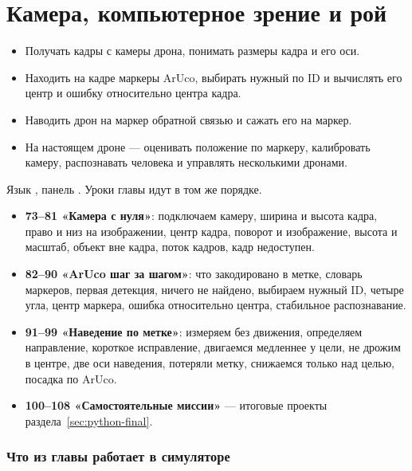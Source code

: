 \section{Камера, компьютерное зрение и рой}
\label{sec:python-vision}

\begin{infobox}
\begin{itemize}
    \item Получать кадры с камеры дрона, понимать размеры кадра и его оси.
    \item Находить на кадре маркеры ArUco, выбирать нужный по ID и вычислять его центр и ошибку относительно центра кадра.
    \item Наводить дрон на маркер обратной связью и сажать его на маркер.
    \item На настоящем дроне --- оценивать положение по маркеру, калибровать камеру, распознавать человека и управлять несколькими дронами.
\end{itemize}
\end{infobox}

\begin{missionbox}
Язык , панель . Уроки главы идут в том же порядке.
\begin{itemize}
    \item \textbf{73--81 «Камера с нуля»}: подключаем камеру, ширина и высота кадра, право и низ на изображении, центр кадра, поворот и изображение, высота и масштаб, объект вне кадра, поток кадров, кадр недоступен.
    \item \textbf{82--90 «ArUco шаг за шагом»}: что закодировано в метке, словарь маркеров, первая детекция, ничего не найдено, выбираем нужный ID, четыре угла, центр маркера, ошибка относительно центра, стабильное распознавание.
    \item \textbf{91--99 «Наведение по метке»}: измеряем без движения, определяем направление, короткое исправление, двигаемся медленнее у цели, не дрожим в центре, две оси наведения, потеряли метку, снижаемся только над целью, посадка по ArUco.
    \item \textbf{100--108 «Самостоятельные миссии»} --- итоговые проекты раздела~\ref{sec:python-final}.
\end{itemize}
\end{missionbox}

\subsubsection*{Что из главы работает в симуляторе}

